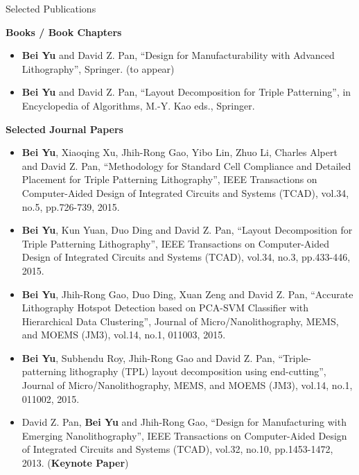 \begin{rSection}{Selected Publications}

\textbf{Books / Book Chapters}
\begin{itemize}[font=\normalfont]
\item{
    \textbf{Bei Yu} and David Z. Pan,
    ``Design for Manufacturability with Advanced Lithography'',
    Springer. (to appear)
}
\item{
    \textbf{Bei Yu} and David Z. Pan,
    ``Layout Decomposition for Triple Patterning'',
    in Encyclopedia of Algorithms, M.-Y. Kao eds., Springer.
}
\end{itemize}


\textbf{Selected Journal Papers}
\begin{itemize}[font=\normalfont]
\item{
  \textbf{Bei Yu}, Xiaoqing Xu, Jhih-Rong Gao, Yibo Lin, Zhuo Li, Charles Alpert and David Z. Pan,
  ``Methodology for Standard Cell Compliance and Detailed Placement for Triple Patterning Lithography'',
  IEEE Transactions on Computer-Aided Design of Integrated Circuits and Systems (TCAD), vol.34, no.5, pp.726-739, 2015.
}
\item{
  \textbf{Bei Yu}, Kun Yuan, Duo Ding and David Z. Pan,
  ``Layout Decomposition for Triple Patterning Lithography'',
  IEEE Transactions on Computer-Aided Design of Integrated Circuits and Systems (TCAD), vol.34, no.3, pp.433-446, 2015.
}
\item{
  \textbf{Bei Yu}, Jhih-Rong Gao, Duo Ding, Xuan Zeng and David Z. Pan,
  ``Accurate Lithography Hotspot Detection based on PCA-SVM Classifier with Hierarchical Data Clustering'',
  Journal of Micro/Nanolithography, MEMS, and MOEMS (JM3), vol.14, no.1, 011003, 2015.
}
\item{
  \textbf{Bei Yu}, Subhendu Roy, Jhih-Rong Gao and David Z. Pan,
  ``Triple-patterning lithography (TPL) layout decomposition using end-cutting'',
  Journal of Micro/Nanolithography, MEMS, and MOEMS (JM3), vol.14, no.1, 011002, 2015.
}
\item{
  David Z. Pan, \textbf{Bei Yu} and Jhih-Rong Gao,
  ``Design for Manufacturing with Emerging Nanolithography'', 
  IEEE Transactions on Computer-Aided Design of Integrated Circuits and Systems (TCAD), vol.32, no.10, pp.1453-1472, 2013.
  (\textbf{Keynote Paper})
}
\end{itemize}


\end{rSection}
